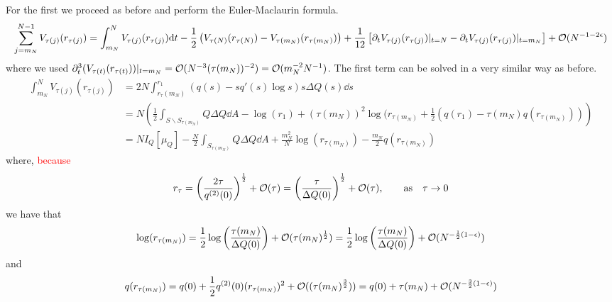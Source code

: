 For the first we proceed as before and perform the Euler-Maclaurin formula.
\begin{equation}
	\sum_{j=m_N}^{N-1} V_{\tau(j)}(r_{\tau(j)}) = \int_{m_N}^N V_{\tau(j)}(r_{\tau(j)})  \mathrm{d} t - \frac{1}{2} \left( V_{\tau(N)}(r_{\tau(N)})  - V_{\tau(m_N)}(r_{\tau(m_N)}) \right) + \frac{1}{12} \left[ \partial_t V_{\tau(j)}(r_{\tau(j)}) |_{t=N} - \partial_t V_{\tau(j)}(r_{\tau(j)}) |_{t=m_N} \right] + \mathcal{O}(N^{-1-2\epsilon})
\end{equation}
where we used $\partial^3_t(V_{\tau(t)}(r_{\tau(t)})) |_{t=m_N} = \mathcal{O}(N^{-3} (\tau(m_N))^{-2}) = \mathcal{O}(m_N^{-2} N^{-1})$. The first term can be solved in a very similar way as before.
\begin{align}
	\int_{m_N}^{N} V_{\tau(j)}(r_{\tau(j)}) & = 2N \int_{r_\tau(m_N)}^{r_1} (q(s) - s q'(s) \log s) s \Delta Q(s) \dd s \\
	& = N \left( \frac{1}{2} \int_{S \backslash S_{\tau(m_N)}} Q \Delta Q \dd A - \log(r_1) + (\tau(m_N))^2 \log(r_{\tau(m_N)} + \frac{1}{2} \left( q(r_1) - \tau(m_N) q(r_{\tau(m_N)}) \right) \right) \\
	& = N I_Q[\mu_Q] - \frac{N}{2} \int_{S_{\tau(m_N)}} Q \Delta Q \dd A + \frac{m_N^2}{N} \log(r_{\tau(m_N)}) - \frac{m_N}{2} q(r_{\tau(m_N)}) 
\end{align}
where, \textcolor{red}{because 
\begin{equation}
	r_\tau = \left(\frac{2 \tau}{q^{(2)}(0)} \right)^{\frac{1}{2}} + \mathcal{O}(\tau) = \left(\frac{\tau}{\Delta Q(0)} \right)^{\frac{1}{2}} + \mathcal{O}(\tau), \qquad \text{as} \quad \tau \rightarrow 0
\end{equation}}
we have that
\begin{equation}
	\log(r_{\tau(m_N)}) = \frac{1}{2} \log{\left(\frac{\tau(m_N)}{\Delta Q(0)}\right)} + \mathcal{O}(\tau(m_N)^{\frac{1}{2}}) = \frac{1}{2} \log{\left(\frac{\tau(m_N)}{\Delta Q(0)}\right)} + \mathcal{O}(N^{-\frac{1}{2}(1-\epsilon)}) 
\end{equation}
and
\begin{equation}
	q(r_{\tau(m_N)}) = q(0) + \frac{1}{2} q^{(2)}(0)(r_{\tau(m_N)})^2 + \mathcal{O}((\tau(m_N)^{\frac{3}{2}})) = q(0) + \tau(m_N) + \mathcal{O}(N^{-\frac{3}{2}(1 - \epsilon)})
\end{equation}